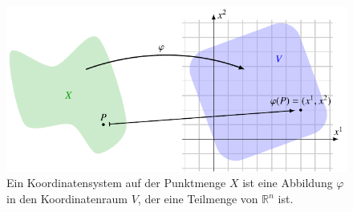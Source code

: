%
%
%
\begin{figure}
\centering
\includegraphics{chapters/020-koordinaten/images/koordinaten.pdf}
\caption{Ein Koordinatensystem auf der Punktmenge $X$ ist eine Abbildung 
$\varphi$ in den Koordinatenraum $V$, der eine Teilmenge von
$\mathbb{R}^n$ ist.
\label{buch:koordinaten:koordinaten:fig:koordinaten}}
\end{figure}
